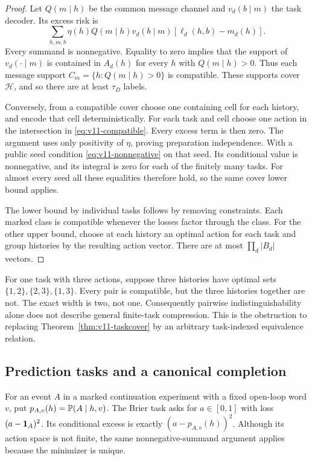 \begin{proof}
Let $Q(m\mid h)$ be the common message channel and $v_d(b\mid m)$ the
task decoder. Its excess risk is
\begin{equation}
 \sum_{h,m,b}\eta(h)Q(m\mid h)v_d(b\mid m)
                    [\ell_d(h,b)-m_d(h)].
 \label{eq:v11-nonnegative}
\end{equation}
Every summand is nonnegative. Equality to zero implies that the support
of $v_d(\cdot\mid m)$ is contained in $A_d(h)$ for every $h$ with
$Q(m\mid h)>0$. Thus each message support
$C_m=\{h:Q(m\mid h)>0\}$ is compatible. These supports cover
$\mathcal H$, and so there are at least $\tau_D$ labels.

Conversely, from a compatible cover choose one containing cell for each
history, and encode that cell deterministically. For each task and cell
choose one action in the intersection in \eqref{eq:v11-compatible}.
Every excess term is then zero. The argument uses only positivity of
$\eta$, proving preparation independence. With a public seed condition
\eqref{eq:v11-nonnegative} on that seed. Its conditional value is
nonnegative, and its integral is zero for each of the finitely many tasks.
For almost every seed all these equalities therefore hold, so the same
cover lower bound applies.

The lower bound by individual tasks follows by removing constraints.
Each marked class is compatible whenever the losses factor through the
class. For the other upper bound, choose at each history an optimal
action for each task and group histories by the resulting action vector.
There are at most $\prod_d|B_d|$ vectors.
\end{proof}

\begin{example}
For one task with three actions, suppose three histories have optimal
sets $\{1,2\},\{2,3\},\{1,3\}$. Every pair is compatible, but the three
histories together are not. The exact width is two, not one. Consequently
pairwise indistinguishability alone does not describe general finite-task
compression. This is the obstruction to replacing
Theorem~\ref{thm:v11-taskcover} by an arbitrary task-indexed equivalence
relation.
\end{example}

\subsection{Prediction tasks and a canonical completion}
For an event $A$ in a marked continuation experiment with a fixed
open-loop word $v$, put $p_{A,v}(h)=\mathbb P(A\mid h,v)$. The Brier task asks
for $a\in[0,1]$ with loss $(a-\mathbf 1_A)^2$. Its conditional excess is exactly
$(a-p_{A,v}(h))^2$. Although its action space is not finite, the same
nonnegative-summand argument applies because the minimizer is unique.

